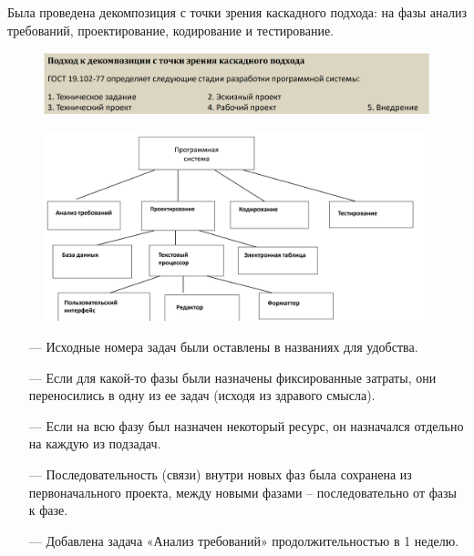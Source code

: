 Была проведена декомпозиция с точки зрения каскадного подхода: на фазы анализ требований, проектирование, кодирование и тестирование.

\newpage

\begin{figure}[h!]
	\begin{center}
		\includegraphics[scale=0.35]{inc/img/p_14.png}
	\end{center}
	\captionsetup{justification=centering}
	\label{fig:u3}
\end{figure}

\begin{figure}[h!]
	\begin{center}
		\includegraphics[scale=0.4]{inc/img/p_13.png}
	\end{center}
	\captionsetup{justification=centering}
	\label{fig:u3}
\end{figure}

\begin{itemize}
    \item[---] Исходные номера задач были оставлены в названиях для удобства.
    \item[---] Если для какой-то фазы были назначены фиксированные затраты, они переносились в одну из ее задач (исходя из здравого смысла). 
    \item[---] Если на всю фазу был назначен некоторый ресурс, он назначался отдельно на каждую из подзадач.
    \item[---] Последовательность (связи) внутри новых фаз была сохранена из первоначального проекта, между новыми фазами – последовательно от фазы к фазе.
    \item[---] Добавлена задача «Анализ требований» продолжительностью в 1 неделю.
\end{itemize}

